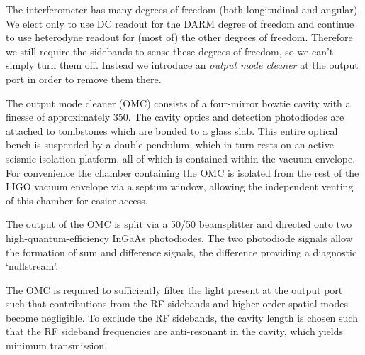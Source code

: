 \label{chapter4}
\doublespace
{}
The interferometer has many degrees of freedom (both longitudinal and
angular).  We elect only to use DC readout for the DARM degree of
freedom and continue to use heterodyne readout for (most of) the other
degrees of freedom.  Therefore we still require the sidebands to sense
these degrees of freedom, so we can't simply turn them off.  Instead
we introduce an \emph{output mode cleaner} at the output port in order
to remove them there.


The output mode cleaner (OMC) consists of a four-mirror bowtie cavity
with a finesse of approximately 350. The cavity optics and detection
photodiodes are attached to tombstones which are bonded to a glass
slab. This entire optical bench is suspended by a double pendulum,
which in turn rests on an active seismic isolation platform, all of
which is contained within the vacuum envelope. For convenience the
chamber containing the OMC is isolated from the rest of the LIGO vacuum
envelope via a septum window, allowing the independent venting of
this chamber for easier access.

The output of the OMC is split via a 50/50 beamsplitter and directed
onto two high-quantum-efficiency InGaAs photodiodes. The two photodiode
signals allow the formation of sum and difference signals, the difference
providing a diagnostic `nullstream'.



The OMC is required to sufficiently filter the light present at the
output port such that contributions from the RF sidebands and higher-order
spatial modes become negligible. To exclude the RF sidebands, the
cavity length is chosen such that the RF sideband frequencies are
anti-resonant in the cavity, which yields minimum transmission.


